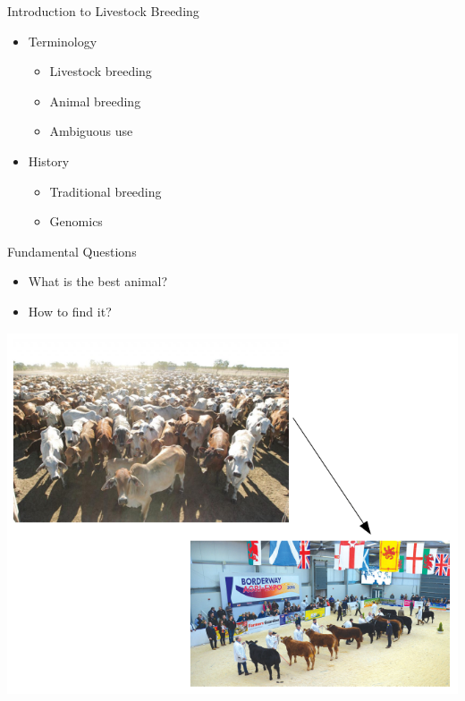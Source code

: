 \documentclass[ignorenonframetext,]{beamer}
\providecommand{\tightlist}{%
  \setlength{\itemsep}{0pt}\setlength{\parskip}{0pt}}
\begin{document}
\begin{frame}{Introduction to Livestock Breeding}
\protect\hypertarget{introduction-to-livestock-breeding}{}

\begin{itemize}
\tightlist
\item
  Terminology

  \begin{itemize}
  \tightlist
  \item
    Livestock breeding
  \item
    Animal breeding
  \item
    Ambiguous use
  \end{itemize}
\item
  History

  \begin{itemize}
  \tightlist
  \item
    Traditional breeding
  \item
    Genomics
  \end{itemize}
\end{itemize}


\end{frame}

\begin{frame}{Fundamental Questions}
\protect\hypertarget{fundamental-questions}{}

\begin{itemize}
\tightlist
\item
  What is the best animal?
\item
  How to find it?
\end{itemize}

\includegraphics{odg/bestanimal.png}


\end{frame}
\end{document}
